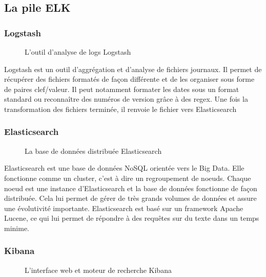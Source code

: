 \subsection{La pile ELK}
\subsubsection{Logstash}

\begin{figure}[!h]
\centering
\def\svgwidth{0.2\columnwidth}

\caption{L'outil d'analyse de logs Logstash}
\label{logstash}
\end{figure}

Logstash est un outil d'aggrégation et d'analyse de fichiers journaux. Il permet de récupérer des fichiers formatés de façon différente et de les organiser sous forme de paires clef/valeur. Il peut notamment formater les dates sous un format standard ou reconnaître des numéros de version grâce à des regex. Une fois la transformation des fichiers terminée, il renvoie le fichier vers Elasticsearch

\subsubsection{Elasticsearch}

\begin{figure}[!h]
\centering
\def\svgwidth{0.2\columnwidth}

\caption{La base de données distribuée Elasticsearch}
\label{elasticsearch}
\end{figure}

Elasticsearch est une base de données NoSQL orientée vers le Big Data. Elle fonctionne comme un cluster, c'est à dire un regroupement de noeuds. Chaque noeud est une instance d'Elasticsearch et la base de données fonctionne de façon distribuée. Cela lui permet de gérer de très grands volumes de données et assure une évolutivité importante. Elasticsearch est basé sur un framework Apache Lucene, ce qui lui permet de répondre à des requêtes sur du texte dans un temps minime.

\subsubsection{Kibana}

\begin{figure}[!h]
\centering
\def\svgwidth{0.2\columnwidth}

\caption{L'interface web et moteur de recherche Kibana}
\label{kibana}
\end{figure}

